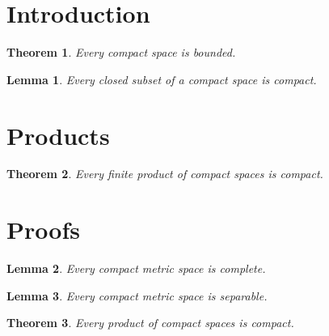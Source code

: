 \documentclass{informs3}
\newtheorem{theorem}{Theorem}
\newtheorem{lemma}{Lemma}
\begin{document}
\section{Introduction}
\begin{theorem} Every compact space is bounded. \end{theorem}
\begin{lemma} Every closed subset of a compact space is compact. \end{lemma}
\section{Products}
\begin{theorem} Every finite product of compact spaces is compact. \end{theorem}
\ECSwitch
\section{Proofs}
\begin{lemma} Every compact metric space is complete. \end{lemma}
\begin{lemma} Every compact metric space is separable. \end{lemma}
\begin{theorem} Every product of compact spaces is compact. \end{theorem}
\end{document}
